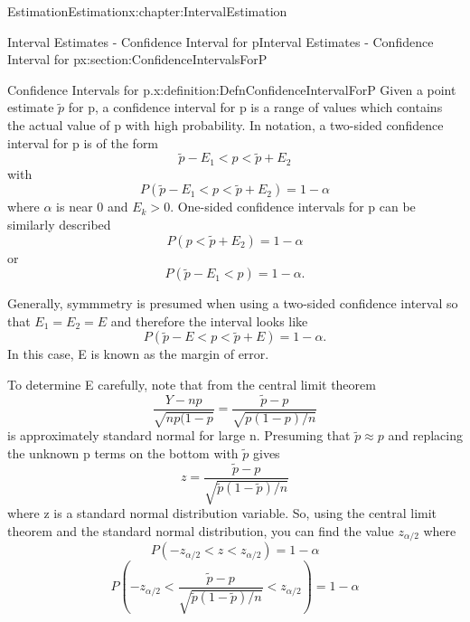 \documentclass[oneside,10pt,]{book}
\numberwithin{equation}{section}
\newcommand{\lt}{<}
\newcommand{\gt}{>}
\begin{document}
\begin{chapterptx}{Estimation}{}{Estimation}{}{}{x:chapter:IntervalEstimation}
\begin{sectionptx}{Interval Estimates - Confidence Interval for p}{}{Interval Estimates - Confidence Interval for p}{}{}{x:section:ConfidenceIntervalsForP}
\begin{definition}{Confidence Intervals for p.}{x:definition:DefnConfidenceIntervalForP}%
Given a point estimate \(\tilde{p}\) for p, a confidence interval for p is a range of values which contains the actual value of p with high probability. In notation, a two-sided confidence interval for p is of the form%
\begin{equation*}
\tilde{p} - E_1 \lt p \lt \tilde{p} + E_2
\end{equation*}
with%
\begin{equation*}
P(\tilde{p} - E_1 \lt p \lt \tilde{p} + E_2) = 1 - \alpha
\end{equation*}
where \(\alpha\) is near 0 and \(E_k \gt 0\).  One-sided confidence intervals for p can be similarly described%
\begin{equation*}
P( p \lt \tilde{p} + E_2) = 1 - \alpha
\end{equation*}
or%
\begin{equation*}
P(\tilde{p} - E_1 \lt p) = 1 - \alpha.
\end{equation*}
%
\end{definition}
Generally, symmmetry is presumed when using a two-sided confidence interval so that \(E_1 = E_2 = E\) and therefore the interval looks like%
\begin{equation*}
P(\tilde{p} - E \lt p \lt \tilde{p} + E) = 1 - \alpha.
\end{equation*}
In this case, E is known as the margin of error.%
\par
To determine E carefully, note that from the central limit theorem%
\begin{equation*}
\frac{Y-np}{\sqrt{np(1-p}} = \frac{\tilde{p} - p}{\sqrt{p(1-p)/n}}
\end{equation*}
is approximately standard normal for large n.  Presuming that \(\tilde{p} \approx p\) and replacing the unknown p terms on the bottom with \(\tilde{p}\) gives%
\begin{equation*}
z = \frac{\tilde{p} - p}{\sqrt{\tilde{p}(1-\tilde{p})/n}}
\end{equation*}
where z is a standard normal distribution variable. So, using the central limit theorem and the standard normal distribution, you can find the value \(z_{ \alpha/2}\) where%
\begin{equation*}
P( -z_{ \alpha/2} \lt z \lt z_{ \alpha/2}) = 1 - \alpha
\end{equation*}
%
\begin{equation*}
P( -z_{ \alpha/2} \lt \frac{\tilde{p} - p}{\sqrt{\tilde{p}(1-\tilde{p})/n}} \lt z_{ \alpha/2}) = 1 - \alpha

\end{equation*}
\end{sectionptx}
\end{chapterptx}
\end{document}
